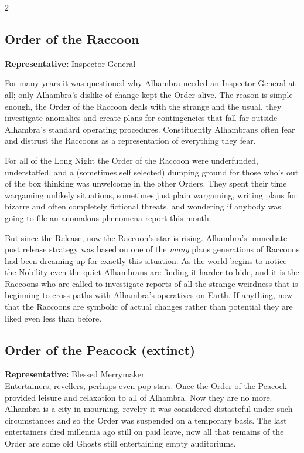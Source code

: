 \begin{multicols}{2}
\subsection*{Order of the Raccoon}

\textbf{Representative:} Inspector General

\noindent For many years it was questioned why Alhambra needed an Inspector General at all; only Alhambra's dislike of change kept the Order alive. The reason is simple enough, the Order of the Raccoon deals with the strange and the usual, they investigate anomalies and create plans for contingencies that fall far outside Alhambra's standard operating procedures. Constituently Alhambrans often fear and distrust the Raccoons as a representation of everything they fear. 

For all of the Long Night the Order of the Raccoon were underfunded, understaffed, and a (sometimes self selected) dumping ground for those who's out of the box thinking was unwelcome in the other Orders. They spent their time wargaming unlikely situations, sometimes just plain wargaming, writing plans for bizarre and often completely fictional threats, and wondering if anybody was going to file an anomalous phenomena report this month. 

But since the Release, now the Raccoon's star is rising. Alhambra's immediate post release strategy was based on one of the \textit{many} plans generations of Raccoons had been dreaming up for exactly this situation. As the world begins to notice the Nobility even the quiet Alhambrans are finding it harder to hide, and it is the Raccoons who are called to investigate reports of all the strange weirdness that is beginning to cross paths with Alhambra's operatives on Earth. If anything, now that the Raccoons are symbolic of actual changes rather than potential they are liked even less than before.

\subsection*{Order of the Peacock (extinct)}

\textbf{Representative:} Blessed Merrymaker\\

\noindent Entertainers, revellers, perhaps even pop-stars. Once the Order of the Peacock provided leisure and relaxation to all of Alhambra. Now they are no more. Alhambra is a city in mourning, revelry it was considered distasteful under such circumstances and so the Order was suspended on a temporary basis. The last entertainers died millennia ago still on paid leave, now all that remains of the Order are some old Ghosts still entertaining empty auditoriums.


\end{multicols}
